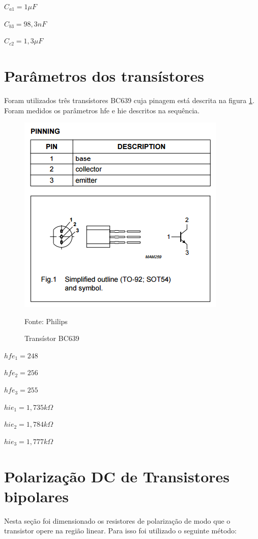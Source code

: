 \documentclass[openright]{normas-utf-tex} %
\begin{document}
$C_{a1} = 1 \mu F$

$C_{b3} = 98,3 nF$

$C_{c2} = 1,3 \mu F$


\section{Parâmetros dos transístores}
\label{sec:par_trans}

Foram utilizados três transístores BC639 cuja pinagem está descrita na figura \ref{fig:bc_639}. Foram medidos os parâmetros hfe e hie descritos na sequência.

\begin{figure}[H]
\centering
\includegraphics[width=0.75\linewidth]{img/BC639.png}
\caption{Transístor BC639}
Fonte: Philips
\label{fig:bc_639}
\end{figure}

$hfe_1 = 248$

$hfe_2= 256$

$hfe_3 = 255$

$hie_1= 1,735 k\Omega$

$hie_2= 1,784 k\Omega$

$hie_3= 1,777 k\Omega$


\section{Polarização DC de Transistores bipolares}
\label{sec:dim_trans}

Nesta seção foi dimensionado os resistores de polarização de modo que o transistor opere na região linear. Para isso foi utilizado o seguinte método:
\end{document}
